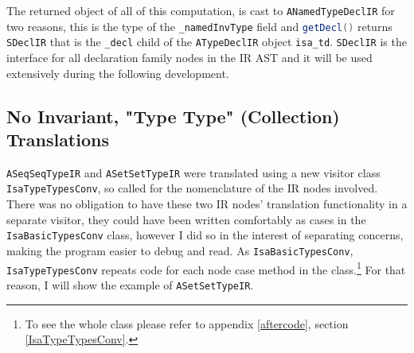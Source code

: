     The returned object of all of this computation, is cast to \lstinline[language=Java]{ANamedTypeDeclIR} for two reasons, this is the type of the \lstinline[language=Java]{_namedInvType} field and \lstinline[language=Java]{getDecl()} returns \lstinline[language=Java]{SDeclIR} that is the \lstinline[language=Java]{_decl} child of the \lstinline[language=Java]{ATypeDeclIR} object \lstinline[language=Java]{isa_td}. \lstinline[language=Java]{SDeclIR} is the interface for all declaration family nodes in the IR AST and it will be used extensively during the following development.

    \subsection{No Invariant, "Type Type" (Collection) Translations}
    \lstinline[language=Java]{ASeqSeqTypeIR} and \lstinline[language=Java]{ASetSetTypeIR} were translated using a new visitor class \lstinline[language=Java]{IsaTypeTypesConv}, so called for the nomenclature of the IR nodes involved. There was no obligation to have these two IR nodes' translation functionality in a separate visitor, they could have been written comfortably as cases in the \lstinline[language=Java]{IsaBasicTypesConv} class, however I did so in the interest of separating concerns, making the program easier to debug and read. As \lstinline[language=Java]{IsaBasicTypesConv}, \lstinline[language=Java]{IsaTypeTypesConv} repeats code for each node case method in the class.\footnote{To see the whole class please refer to appendix \ref{aftercode}, section \ref{IsaTypeTypesConv}.} For that reason, I will show the example of \lstinline[language=Java]{ASetSetTypeIR}.
